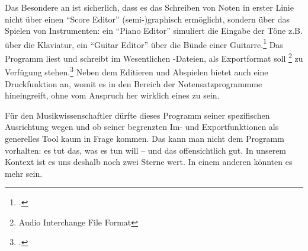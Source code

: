 Das Besondere an  ist sicherlich, dass es das Schreiben von
Noten in erster Linie nicht über einen \enquote{Score Editor} (semi-)graphisch
ermöglicht, sondern über das Spielen von Instrumenten: ein \enquote{Piano Editor}
simuliert die Eingabe der Töne z.B. über die Klaviatur, ein \enquote{Guitar
Editor} über die Bünde einer Guitarre.\footcite[vgl.][\nopage
wp.]{AriaMaestosa2017b} Das Programm liest und schreibt im Wesentlichen
-Dateien, als Exportformat soll \footnote{Audio Interchange
File Format} zu Verfügung stehen.\footcite[vgl.][\nopage wp.]{Guepewi2017a} Neben
dem Editieren und Abspielen bietet  auch eine
Druckfunktion an, womit es in den Bereich der Notensatzprogrammme hineingreift,
ohne vom Anspruch her wirklich eines zu sein.

Für den Musikwissenschaftler dürfte dieses Programm seiner spezifischen
Ausrichtung wegen und ob seiner begrenzten Im- und Exportfunktionen als generelles
Tool kaum in Frage kommen. Das kann man nicht dem Programm vorhalten: es
tut das, was es tun will -- und das offensichtlich gut. In unserem Kontext ist
es uns deshalb noch zwei Sterne wert. In einem anderen könnten es mehr sein.

% 

